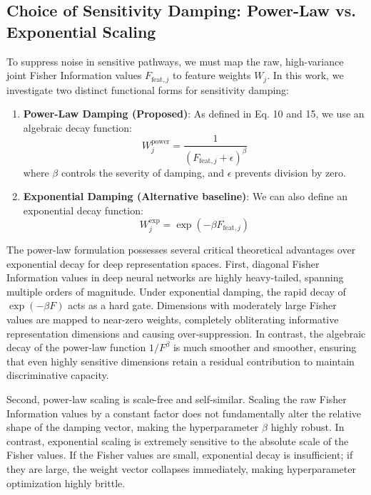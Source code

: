 \documentclass{article}
\theoremstyle{plain}
\theoremstyle{definition}
\theoremstyle{remark}
\begin{document}
\subsection{Choice of Sensitivity Damping: Power-Law vs. Exponential Scaling}
To suppress noise in sensitive pathways, we must map the raw, high-variance joint Fisher Information values $F_{\text{feat}, j}$ to feature weights $W_j$. In this work, we investigate two distinct functional forms for sensitivity damping:
\begin{enumerate}
    \item \textbf{Power-Law Damping (Proposed)}: As defined in Eq. 10 and 15, we use an algebraic decay function:
    \begin{equation}
        W_j^{\text{power}} = \frac{1}{(F_{\text{feat}, j} + \epsilon)^\beta}
    \end{equation}
    where $\beta$ controls the severity of damping, and $\epsilon$ prevents division by zero.
    \item \textbf{Exponential Damping (Alternative baseline)}: We can also define an exponential decay function:
    \begin{equation}
        W_j^{\text{exp}} = \exp(-\beta F_{\text{feat}, j})
    \end{equation}
\end{enumerate}

The power-law formulation possesses several critical theoretical advantages over exponential decay for deep representation spaces. First, diagonal Fisher Information values in deep neural networks are highly heavy-tailed, spanning multiple orders of magnitude. Under exponential damping, the rapid decay of $\exp(-\beta F)$ acts as a hard gate. Dimensions with moderately large Fisher values are mapped to near-zero weights, completely obliterating informative representation dimensions and causing over-suppression. In contrast, the algebraic decay of the power-law function $1/F^\beta$ is much smoother and smoother, ensuring that even highly sensitive dimensions retain a residual contribution to maintain discriminative capacity.

Second, power-law scaling is scale-free and self-similar. Scaling the raw Fisher Information values by a constant factor does not fundamentally alter the relative shape of the damping vector, making the hyperparameter $\beta$ highly robust. In contrast, exponential scaling is extremely sensitive to the absolute scale of the Fisher values. If the Fisher values are small, exponential decay is insufficient; if they are large, the weight vector collapses immediately, making hyperparameter optimization highly brittle.
\end{document}
